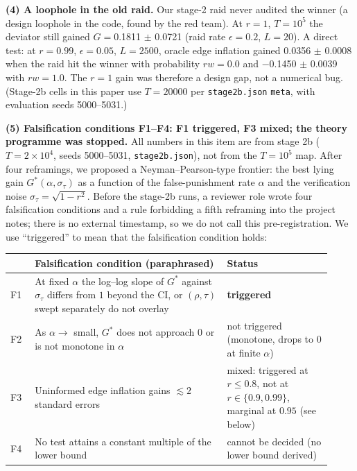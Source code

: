 \documentclass[10pt]{article}
\begin{document}
\textbf{(4) A loophole in the old raid.} Our stage-2 raid never audited the winner (a design loophole in the code, found by the red team). At $r{=}1$, $T{=}10^5$ the deviator still gained $G={}$0.1811 $\pm$ 0.0721 (raid rate $\epsilon{=}0.2$, $L{=}20$). A direct test: at $r{=}0.99$, $\epsilon{=}0.05$, $L{=}2500$, oracle edge inflation gained 0.0356 $\pm$ 0.0008 when the raid hit the winner with probability $rw{=}0.0$ and $-$0.1450 $\pm$ 0.0039 with $rw{=}1.0$. The $r{=}1$ gain was therefore a design gap, not a numerical bug. (Stage-2b cells in this paper use $T{=}20000$ per \texttt{stage2b.json} \texttt{meta}, with evaluation seeds 5000--5031.)

\textbf{(5) Falsification conditions F1--F4: F1 triggered, F3 mixed; the theory programme was stopped.} All numbers in this item are from stage 2b ($T=2\times10^4$, seeds 5000--5031, \texttt{stage2b.json}), not from the $T=10^5$ map. After four reframings, we proposed a Neyman--Pearson-type frontier: the best lying gain $G^*(\alpha,\sigma_\tau)$ as a function of the false-punishment rate $\alpha$ and the verification noise $\sigma_\tau=\sqrt{1-r^2}$. Before the stage-2b runs, a reviewer role wrote four falsification conditions and a rule forbidding a fifth reframing into the project notes; there is no external timestamp, so we do not call this pre-registration. We use ``triggered'' to mean that the falsification condition holds:
\begin{center}\small\begin{tabular}{@{}p{0.07\linewidth}p{0.55\linewidth}p{0.3\linewidth}@{}}
\toprule
 & Falsification condition (paraphrased) & Status \\ \midrule
F1 & At fixed $\alpha$ the log--log slope of $G^*$ against $\sigma_\tau$ differs from $1$ beyond the CI, or $(\rho,\tau)$ swept separately do not overlay & \textbf{triggered} \\
F2 & As $\alpha\to$ small, $G^*$ does not approach 0 or is not monotone in $\alpha$ & not triggered (monotone, drops to 0 at finite $\alpha$) \\
F3 & Uninformed edge inflation gains $\lesssim2$ standard errors & mixed: triggered at $r\le0.8$, not at $r\in\{0.9,0.99\}$, marginal at $0.95$ (see below) \\
F4 & No test attains a constant multiple of the lower bound & cannot be decided (no lower bound derived) \\ \bottomrule
\end{tabular}\end{center}
\end{document}

